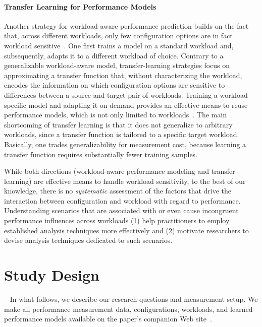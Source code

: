 {\paragraph{Transfer Learning for Performance Models}\label{sec:transfer}
Another strategy for workload-aware performance prediction builds on the fact that, across different workloads, only few configuration options are in fact workload sensitive~\cite{jamishidi_transfer_2017}. One first trains a model on a standard workload and, subsequently, adapts it to a different workload of choice. Contrary to a generalizable workload-aware model, transfer-learning strategies focus on approximating a transfer function that, without characterizing the workload, encodes the information on which configuration options are sensitive to differences between a source and target pair of workloads. Training a workload-specific model and adapting it on demand provides an effective means to reuse performance models, which is not only limited to workloads~\cite{jamshidi_learning_2018, ding_bayesian_2020,valov_transferring_performance_2017,martin_transfer_2021}. The main shortcoming of transfer learning is that it does not generalize to arbitrary workloads, since a transfer function is tailored to a specific target workload. Basically, one trades generalizability for measurement cost, because learning a transfer function requires substantially fewer training samples.

While both directions (workload-aware performance modeling and transfer learning) are effective means to handle workload sensitivity, to the best of our knowledge, there is no \textit{systematic} assessment of the factors that drive the interaction between configuration and workload with regard to performance. Understanding scenarios that are associated with or even cause incongruent performance influences across workloads (1) help practitioners to employ established analysis techniques more effectively and (2) motivate researchers to devise analysis techniques dedicated to such scenarios.

\section{Study Design}~\label{sec:study}
In what follows, we describe our research questions and measurement setup. We make all performance measurement data, configurations, workloads, and learned performance models available on the paper's companion Web site~\cite{muhlbauer_workload_2023_companion}.

}
